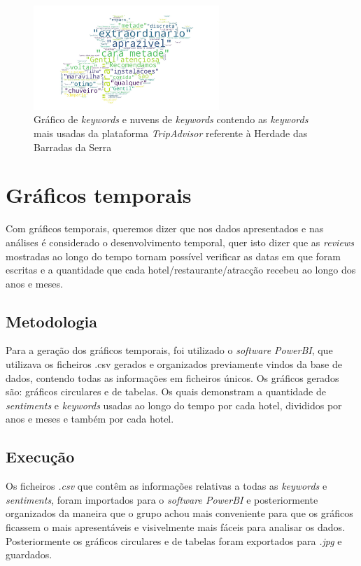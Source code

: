 \begin{figure}[!htb]
\centering
\includegraphics[width=7cm]{figuras/TripAdvisor/Hotels/hotel21_keywordcloud.jpeg}
\caption{Gráfico de \textit{keywords} e nuvens de \textit{keywords} contendo as \textit{keywords} mais usadas da plataforma \textit{TripAdvisor} referente à Herdade das Barradas da Serra}
\label{fig:exemplofig21cloudTrip}
\end{figure}


\section{Gráficos temporais}

Com gráficos temporais, queremos dizer que nos dados apresentados e nas análises é considerado o desenvolvimento temporal, quer isto dizer que as \textit{reviews} mostradas ao longo do tempo tornam possível verificar as datas em que foram escritas e a quantidade que cada hotel/restaurante/atracção recebeu ao longo dos anos e meses.

\subsection{Metodologia}

Para a geração dos gráficos temporais, foi utilizado o \textit{software PowerBI}, que utilizava os ficheiros .csv gerados e organizados previamente vindos da base de dados, contendo todas as informações em ficheiros únicos.
Os gráficos gerados são: gráficos circulares e de tabelas. Os quais demonstram a quantidade de \textit{sentiments} e \textit{keywords} usadas ao longo do tempo por cada hotel, divididos por anos e meses e também por cada hotel.

\subsection{Execução}

Os ficheiros \textit{.csv} que contêm as informações relativas a todas as \textit{keywords} e \textit{sentiments}, foram importados para o \textit{software PowerBI} e posteriormente organizados da maneira que o grupo achou mais conveniente para que os gráficos ficassem o mais apresentáveis e visivelmente mais fáceis para analisar os dados. Posteriormente os gráficos circulares e de tabelas foram exportados para \textit{.jpg} e guardados. 

